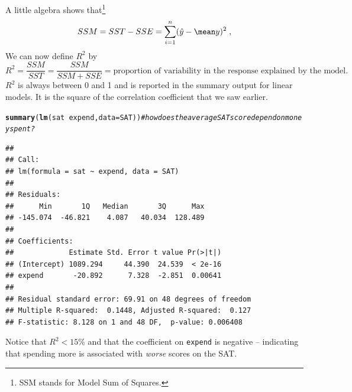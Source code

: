 \documentclass[twoside]{book}\usepackage[]{graphicx}\usepackage[]{xcolor}
\makeatletter
\newcommand{\hlcom}[1]{\textcolor[rgb]{0.678,0.584,0.686}{\textit{#1}}}%
\newcommand{\hlopt}[1]{\textcolor[rgb]{0,0,0}{#1}}%
\newcommand{\hlstd}[1]{\textcolor[rgb]{0.345,0.345,0.345}{#1}}%
\newcommand{\hlkwc}[1]{\textcolor[rgb]{0.333,0.667,0.333}{#1}}%
\newcommand{\hlkwd}[1]{\textcolor[rgb]{0.737,0.353,0.396}{\textbf{#1}}}%
\newenvironment{kframe}{%
 \def\at@end@of@kframe{}%
 \ifinner\ifhmode%
  \def\at@end@of@kframe{\end{minipage}}%
  \begin{minipage}{\columnwidth}%
 \fi\fi%
 \def\FrameCommand##1{\hskip\@totalleftmargin \hskip-\fboxsep
 \colorbox{shadecolor}{##1}\hskip-\fboxsep
     \hskip-\linewidth \hskip-\@totalleftmargin \hskip\columnwidth}%
 \MakeFramed {\advance\hsize-\width
   \@totalleftmargin\z@ \linewidth\hsize
   \@setminipage}}%
 {\par\unskip\endMakeFramed%
 \at@end@of@kframe}
\newenvironment{knitrout}{}{} %
\newcommand{\variable}[1]{{\color{green!50!black}\texttt{#1}}}
\makeatother
\begin{document}
A little algebra shows that\footnote{SSM stands for Model Sum of Squares.}
\[
SSM = SST - SSE = 
\sum_{i=1}^{n} ( \hat y - \mean y)^2 \;,
\]
We can now define $R^2$ by
\[
R^2 = \frac{SSM}{SST}  = \frac{SSM}{ SSM + SSE }
= \mbox{proportion of variability in the response explained by the model.}
\]
$R^2$ is always between 0 and 1 and is reported in the summary output
for linear models.  It is the square of the correlation coefficient
that we saw earlier.
\begin{knitrout}
\color{fgcolor}\begin{kframe}
\begin{alltt}
\hlkwd{summary}\hlstd{(}\hlkwd{lm}\hlstd{(sat} \hlopt{~} \hlstd{expend,} \hlkwc{data} \hlstd{= SAT))}  \hlcom{# how does the average SAT score depend on money spent?}
\end{alltt}
\begin{verbatim}
## 
## Call:
## lm(formula = sat ~ expend, data = SAT)
## 
## Residuals:
##      Min       1Q   Median       3Q      Max 
## -145.074  -46.821    4.087   40.034  128.489 
## 
## Coefficients:
##             Estimate Std. Error t value Pr(>|t|)
## (Intercept) 1089.294     44.390  24.539  < 2e-16
## expend       -20.892      7.328  -2.851  0.00641
## 
## Residual standard error: 69.91 on 48 degrees of freedom
## Multiple R-squared:  0.1448,	Adjusted R-squared:  0.127 
## F-statistic: 8.128 on 1 and 48 DF,  p-value: 0.006408
\end{verbatim}
\end{kframe}
\end{knitrout}
Notice that $R^2 < 15\%$ and that the coefficient on \variable{expend} is negative -- indicating 
that spending more is associated with \emph{worse} scores on the SAT.
\end{document}
